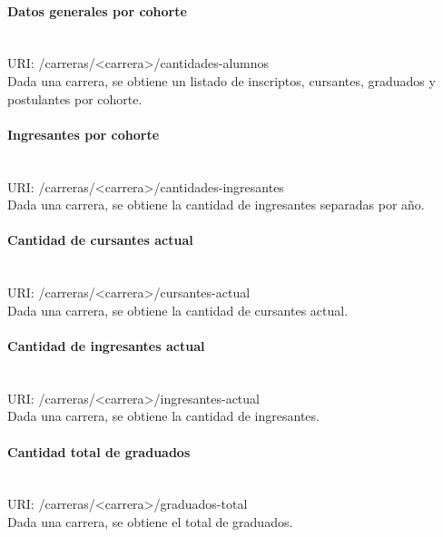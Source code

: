 \paragraph{Datos generales por cohorte}\mbox{}\\

URI: /carreras/<carrera>/cantidades-alumnos \\

Dada una carrera, se obtiene un listado de inscriptos, cursantes, graduados y postulantes por cohorte.


\paragraph{Ingresantes por cohorte}\mbox{}\\

URI: /carreras/<carrera>/cantidades-ingresantes \\

Dada una carrera, se obtiene la cantidad de ingresantes separadas por año.


\paragraph{Cantidad de cursantes actual}\mbox{}\\

URI: /carreras/<carrera>/cursantes-actual \\

Dada una carrera, se obtiene la cantidad de cursantes actual.


\paragraph{Cantidad de ingresantes actual}\mbox{}\\

URI: /carreras/<carrera>/ingresantes-actual \\

Dada una carrera, se obtiene la cantidad de ingresantes.


\paragraph{Cantidad total de graduados} \mbox{}\\

URI: /carreras/<carrera>/graduados-total \\

Dada una carrera, se obtiene el total de graduados.


